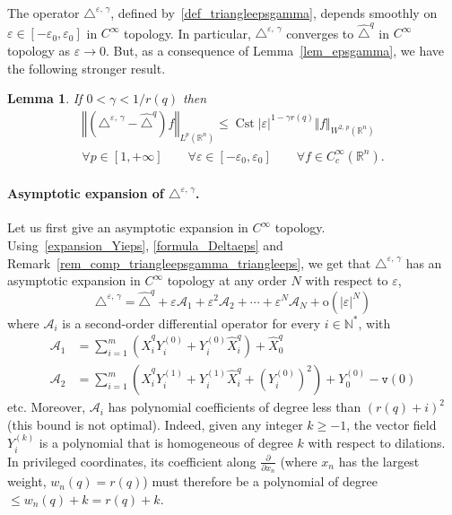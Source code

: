 \documentclass[10pt]{amsart}
\newtheorem{lemm}[theo]{Lemma}\newtheorem{prop}[theo]{Proposition}\newtheorem{coro}[theo]{Corollary}\newtheorem{conj}[theo]{Conjecture}
\theoremstyle{definition}\newtheorem{defi}[theo]{Definition}\newtheorem{rema}[theo]{Remark}\newtheorem{exam}[theo]{Example}\newtheorem{exem}[theo]{Example}\newtheorem{nota}[theo]{Notation}
\newcommand*\R{\mathbb{R}}
\newcommand*\N{\mathbb{N}}
\newcommand{\calA}{\mathcal{A}}
\newcommand{\ttv}{\mathtt{v}}
\newcommand{\rmo}{\mathrm{o}}
\DeclareMathOperator{\Cst}{Cst}
\renewcommand{\geq}{\geqslant}
\renewcommand{\leq}{\leqslant}
\let\oldforall\forall
\renewcommand*{\forall}{\mathrel{\oldforall}}
\begin{document}
The operator $\triangle^{\varepsilon,\,\gamma}$, defined by~\eqref{def_triangleepsgamma}, depends smoothly on $\varepsilon\in[-\varepsilon_0,\varepsilon_0]$ in $C^\infty$ topology. In particular, $\triangle^{\varepsilon,\,\gamma}$ converges to $\widehat{\triangle}^{q}$ in $C^\infty$ topology as $\varepsilon\rightarrow 0$. But, as a consequence of Lemma~\ref{lem_epsgamma}, we have the following stronger result.

\begin{lemm}\label{lem_comp_triangleepsgamma_triangleeps2}
If $0<\gamma<1/r(q)$ then
\begin{multline*}
\left\Vert \left(\triangle^{\varepsilon,\,\gamma} - \widehat{\triangle}^{q}\right) f\right\Vert_{L^p(\R^n)} \leq \Cst \vert\varepsilon\vert^{1-\gamma r(q)}\Vert f\Vert_{W^{2,\,p}(\R^n)} \\
\forall p\in[1,+\infty] \qquad\forall\varepsilon\in[-\varepsilon_0,\varepsilon_0] \qquad \forall f\in C_c^\infty(\R^n).
\end{multline*}
\end{lemm}


\paragraph{Asymptotic expansion of $\triangle^{\varepsilon,\,\gamma}$.}
Let us first give an asymptotic expansion in $C^\infty$ topology. Using~\eqref{expansion_Yieps}, \eqref{formula_Deltaeps} and Remark~\ref{rem_comp_triangleepsgamma_triangleeps}, we get that $\triangle^{\varepsilon,\,\gamma}$ has an asymptotic expansion in $C^\infty$ topology at any order $N$ with respect to $\varepsilon$,
\begin{equation}\label{expansion_triangleepsilon1}
\triangle^{\varepsilon,\,\gamma} = \widehat{\triangle}^{q} + \varepsilon \calA_1 + \varepsilon^2 \calA_2 + \cdots + \varepsilon^N \calA_N + \rmo\left(\vert\varepsilon\vert^N\right)
\end{equation}
where $\calA_i$ is a second-order differential operator for every $i\in\N^*$, with
\begin{equation}\label{def_Ai}
\begin{split}
\calA_1 &= \sum_{i=1}^m \left(\widehat{X}^{q}_i Y^{(0)}_i + Y^{(0)}_i \widehat{X}^{q}_i \right) + \widehat{X}^{q}_0 \\
\calA_2 &= \sum_{i=1}^m \left(\widehat{X}^{q}_i Y^{(1)}_i + Y^{(1)}_i \widehat{X}^{q}_i + \left(Y^{(0)}_i \right)^2 \right) + Y^{(0)}_0 - \ttv(0)
\end{split}
\end{equation}
etc. Moreover, $\calA_i$ has polynomial coefficients of degree less than $(r(q)+i)^2$ (this bound is not optimal). Indeed, given any integer $k\geq -1$, the vector field $Y_i^{(k)}$ is a polynomial that is homogeneous of degree $k$ with respect to dilations. In privileged coordinates, its coefficient along $\frac{\partial}{\partial x_n}$ (where $x_n$ has the largest weight, $w_n(q)=r(q)$) must therefore be a polynomial of degree $\leq w_n(q)+k=r(q)+k$.
\end{document}

